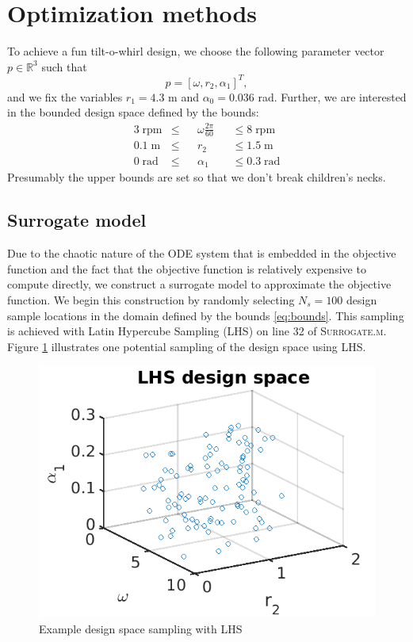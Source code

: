 \documentclass[11pt]{article}
\begin{document}
\section{Optimization methods}

To achieve a fun tilt-o-whirl design, we choose the
following parameter vector $p \in \mathbb{R}^3$ such that
%
\begin{equation}
p = [ \omega,  r_2,  \alpha_1 ]^T,
\end{equation}
%
and we fix the variables $r_1 = 4.3$ m
and $\alpha_0 = 0.036$ rad.
Further, we are interested in the bounded design space
defined by the bounds:
%
\begin{equation}
\begin{aligned}
3 \; \text{rpm} & \leq && \omega \frac{2 \pi}{60} &&\leq 8 \; \text{rpm} \\
0.1 \; \text{m} & \leq && r_2 &&\leq 1.5 \; \text{m} \\
0 \; \text{rad} & \leq && \alpha_1 &&\leq 0.3 \; \text{rad}
\label{eq:bounds}
\end{aligned}
\end{equation}
%
Presumably the upper bounds are set so that we don't
break children's necks.

\subsection{Surrogate model}

Due to the chaotic nature of the ODE system that is embedded in
the objective function and the fact that the objective function
is relatively expensive to compute directly, we construct a
surrogate model to approximate the objective function. We begin
this construction by randomly selecting $N_s = 100$ design sample
locations in the domain defined by the bounds \eqref{eq:bounds}.
This sampling is achieved with Latin Hypercube Sampling (LHS)
on line 32 of \textsc{Surrogate.m}. Figure \ref{fig:lhs}
illustrates one potential sampling of the design space using
LHS.

\begin{figure}[hbt!]
\centering
\includegraphics[width=.5\linewidth]{designspace}
\caption{Example design space sampling with LHS}
\label{fig:lhs}
\end{figure}
\end{document}
